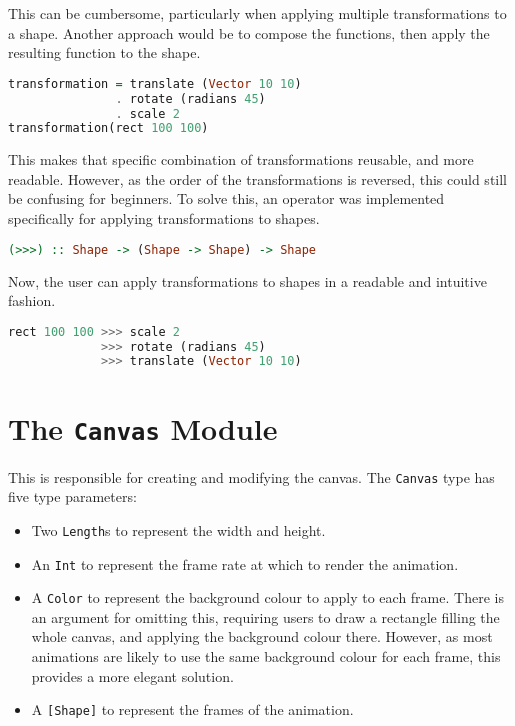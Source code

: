 \documentclass[../main.tex]{subfiles}
\begin{document}
                This can be cumbersome, particularly when applying multiple transformations to
                    a shape.
                Another approach would be to compose the functions, then apply the resulting
                    function to the shape.

                \begin{lstlisting}[language={Haskell}]
transformation = translate (Vector 10 10)
               . rotate (radians 45)
               . scale 2
transformation(rect 100 100)\end{lstlisting}

                This makes that specific combination of transformations reusable, and more
                    readable.
                However, as the order of the transformations is reversed, this could still be
                    confusing for beginners.
                To solve this, an operator was implemented specifically for applying
                    transformations to shapes.

                \begin{lstlisting}[language={Haskell}, label={lst:transform}, caption={The 
                    transformation application (\texttt{>>>}) operator.}]
(>>>) :: Shape -> (Shape -> Shape) -> Shape\end{lstlisting}

                Now, the user can apply transformations to shapes in a readable and intuitive
                    fashion.

                \begin{lstlisting}[language={Haskell}]
rect 100 100 >>> scale 2
             >>> rotate (radians 45)
             >>> translate (Vector 10 10)\end{lstlisting}

    \section{The \texttt{Canvas}
        Module} This is responsible for creating and modifying the canvas.
        The \texttt{Canvas} type has five type parameters:
        \begin{itemize}
            \item Two \texttt{Length}s to represent the width and height.
            \item An \texttt{Int} to represent the frame rate at which to render the animation.
            \item A \texttt{Color} to represent the background colour to apply to each frame.
                  There is an argument for omitting this, requiring users to draw a rectangle
                      filling the whole canvas, and applying the background colour there.
                  However, as most animations are likely to use the same background colour for
                      each frame, this provides a more elegant solution.
            \item A \texttt{[Shape]} to represent the frames of the animation.
        \end{itemize}
\end{document}
